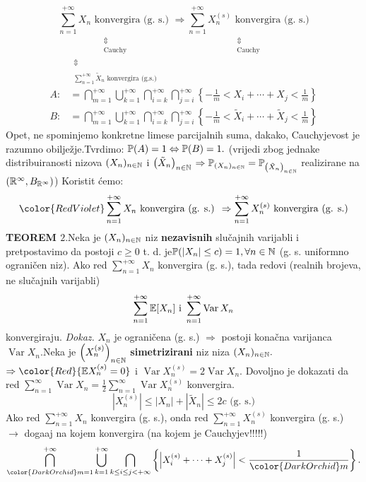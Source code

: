 \documentclass{article}
\newcommand{\Var}{\operatorname{Var}}
\begin{document}
 \[\underset{\substack{\Updownarrow\\\\\displaystyle\sum_{n=1}^{+\infty}\tilde X_n\text{ konvergira (g.s.)}}}{\underset{\substack{\Updownarrow\\\text{Cauchy}}}{\sum_{n=1}^{+\infty}X_n\text{ konvergira (g. s.) }}}\Rightarrow\underset{\substack{\Updownarrow\\\text{Cauchy}}}{\sum_{n=1}^{+\infty}X_n^{(s)}\text{ konvergira (g. s.)}}\] \[\begin{aligned}A:&=\bigcap_{m=1}^{+\infty}\bigcup_{k=1}^{+\infty}\bigcap_{i=k}^{+\infty}\bigcap_{j=i}^{+\infty}\left\{-\frac1m<X_i+\cdots+X_j<\frac1m\right\}\\B:&=\bigcap_{m=1}^{+\infty}\bigcup_{k=1}^{+\infty}\bigcap_{i=k}^{+\infty}\bigcap_{j=i}^{+\infty}\left\{-\frac1m<\tilde X_i+\cdots+\tilde X_j<\frac1m\right\}\end{aligned}\] Opet, ne spominjemo konkretne limese parcijalnih suma, dakako, Cauchyjevost je razumno obilježje.\newline Tvrdimo: \(\Bbb P(A)=1\Leftrightarrow\Bbb P(B)=1.\) (vrijedi zbog jednake distribuiranosti nizova \((X_n)_{n\in\Bbb N}\) i \(\left(\tilde X_n\right)_{n\in\Bbb N}\) \(\Rightarrow\Bbb P_{(X_n)_{n\in\Bbb N}}=\Bbb P_{\left(\tilde X_n\right)_{n\in\Bbb N}}\) realizirane na \(\left(\Bbb R^\infty, B_{\Bbb R^\infty}\right)\)) \newline  Koristit ćemo: \[\color{RedViolet}\sum_{n=1}^{+\infty}X_n\text{ konvergira (g. s.) }\Rightarrow\sum_{n=1}^{+\infty}X_n^{(s)}\text{ konvergira (g. s.)}\] 
 \textbf{TEOREM \(2.\)}\newline Neka je \((X_n)_{n\in\Bbb N}\) niz \textbf{nezavisnih} slučajnih varijabli i pretpostavimo da postoji \(c\ge0\) t. d. je\newline \(\Bbb P(|X_n|\le c)=1,\forall n\in\Bbb N\) (g. s. uniformno ograničen niz). \textcolor{RedViolet}{Ako red \(\sum_{n=1}^{+\infty}X_n\) konvergira (g. s.)}, tada redovi (realnih brojeva, ne slučajnih varijabli) \[\sum_{n=1}^{+\infty}\Bbb E[X_n]\text{ i }\sum_{n=1}^{+\infty}\Var X_n\] konvergiraju.\newline\newline
 \textit{Dokaz.}\newline
 \(X_n\) je ograničena (g. s.) \(\Rightarrow\) postoji konačna varijanca \(\Var X_n.\)\newline Neka je \(\left(X_n^{(s)}\right)_{n\in\Bbb N}\) \textbf{simetrizirani} niz niza \((X_n)_{n\in\Bbb N}.\)\(\Rightarrow{\color{Red}{\Bbb EX_n^{(s)}=0}}\) i \(\Var X_n^{(s)}=2\Var X_n.\) Dovoljno je dokazati da red \(\sum_{n=1}^\infty\Var X_n=\frac12\sum_{n=1}^\infty\Var X_n^{(s)}\) konvergira.\[\left|X_n^{(s)}\right|\le\left|X_n\right|+\left|\tilde X_n\right|\le 2c\text{ (g. s.)}\] \textcolor{RedViolet}{Ako red \(\displaystyle\sum_{n=1}^{+\infty}X_n\) konvergira (g. s.), onda red \(\displaystyle\sum_{n=1}^{+\infty}X_n^{(s)}\) konvergira (g. s.)}  \(\to\) doga\dj{}aj na kojem konvergira (na kojem je Cauchyjev!!!!!) \[\bigcap_{{\color{DarkOrchid}m}=1}^{+\infty}\bigcup_{k=1}^{+\infty}\bigcap_{k\le i\le j<+\infty}\left\{\left|X_i^{(s)}+\cdots+X_j^{(s)}\right|<\frac1{\color{DarkOrchid}m}\right\}.\] 
\end{document}
